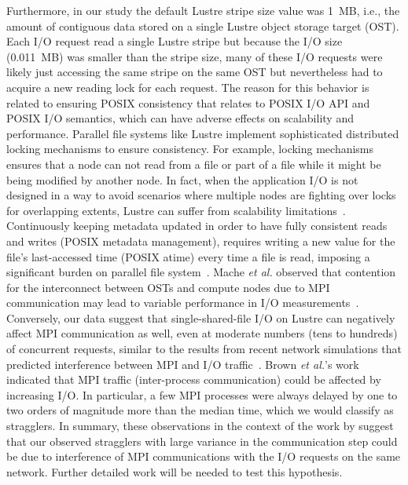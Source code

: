 Furthermore, in our study the default Lustre stripe size value was 1~MB, i.e., the amount of contiguous data stored on a single Lustre object storage target (OST).
Each I/O request read a single Lustre stripe but because the I/O size (0.011~MB) was smaller than the stripe size, many of these I/O requests were likely just accessing the same stripe on the same OST but nevertheless had to acquire a new reading lock for each request.
The reason for this behavior is related to ensuring POSIX consistency that relates to POSIX I/O API and POSIX I/O semantics, which can have adverse effects on scalability and performance.
Parallel file systems like Lustre implement sophisticated distributed locking mechanisms to ensure consistency.
For example, locking mechanisms ensures that a node can not read from a file or part of a file while it might be being modified by another node. 
In fact, when the application I/O is not designed in a way to avoid scenarios where multiple nodes are fighting over locks for overlapping extents, Lustre can suffer from scalability limitations~\cite{optimize_lustre}.
Continuously keeping metadata updated in order to have fully consistent reads and writes (POSIX metadata management), requires writing a new value for the file's last-accessed time (POSIX atime) every time a file is read, imposing a significant burden on parallel file system~\cite{POSIX2017}. 
Mache \textit{et al.} observed that contention for the interconnect between OSTs and compute nodes due to MPI communication may lead to variable performance in I/O measurements~\cite{Mache:2005aa}.
Conversely, our data suggest that single-shared-file I/O on Lustre can negatively affect MPI communication as well, even at moderate numbers (tens to hundreds) of concurrent requests, similar to the results from recent network simulations that predicted interference between MPI and I/O traffic~\cite{Brown:2018ab}.
Brown \textit{et al.}'s  work \cite{Brown:2018ab} indicated that MPI traffic (inter-process communication) could be affected by increasing I/O.
In particular, a few MPI processes were always delayed by one to two orders of magnitude more than the median time, which we would classify as stragglers.
In summary, these observations in the context of the work by \citet{Brown:2018ab} suggest that our observed stragglers with large variance in the communication step could be due to interference of MPI communications with the I/O requests on the same network.
Further detailed work will be needed to test this hypothesis.

